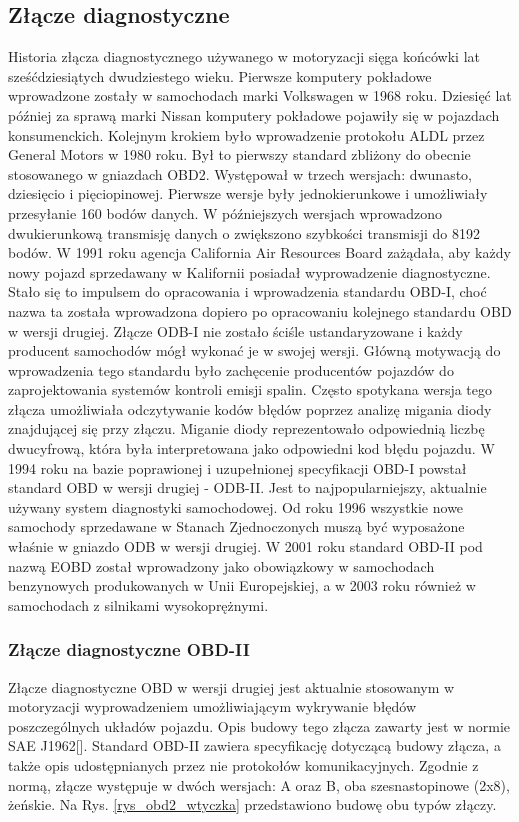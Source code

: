 \documentclass[12pt]{article} %
\numberwithin{equation}{subsection}
\numberwithin{figure}{section}
\numberwithin{table}{section}
\begin{document}
	\subsection{Złącze diagnostyczne}
		\hspace{0.5cm}Historia złącza diagnostycznego używanego w motoryzacji sięga końcówki lat sześćdziesiątych dwudziestego wieku. Pierwsze komputery pokładowe wprowadzone zostały w samochodach marki Volkswagen w 1968 roku. Dziesięć lat później za sprawą marki Nissan komputery pokładowe pojawiły się w pojazdach konsumenckich. Kolejnym krokiem było wprowadzenie protokołu ALDL  przez General Motors w 1980 roku. Był to pierwszy standard zbliżony do obecnie stosowanego w gniazdach OBD2. Występował w trzech wersjach: dwunasto, dziesięcio i pięciopinowej. Pierwsze wersje były jednokierunkowe i umożliwiały przesyłanie 160 bodów danych. W późniejszych wersjach wprowadzono dwukierunkową transmisję danych o zwiększono szybkości transmisji do 8192 bodów. W 1991 roku agencja California Air Resources Board zażądała, aby każdy nowy pojazd sprzedawany w Kalifornii posiadał wyprowadzenie diagnostyczne. Stało się to impulsem do opracowania i wprowadzenia standardu OBD-I, choć nazwa ta została wprowadzona dopiero po opracowaniu kolejnego standardu OBD w wersji drugiej. Złącze ODB-I nie zostało ściśle ustandaryzowane i każdy producent samochodów mógł wykonać je w swojej wersji. Główną motywacją do wprowadzenia tego standardu było zachęcenie producentów pojazdów do zaprojektowania systemów kontroli emisji spalin. Często spotykana wersja tego złącza umożliwiała odczytywanie kodów błędów poprzez analizę migania diody znajdującej się przy złączu. Miganie diody reprezentowało odpowiednią liczbę dwucyfrową, która była interpretowana jako odpowiedni kod błędu pojazdu. W 1994 roku na bazie poprawionej i uzupełnionej specyfikacji OBD-I powstał standard OBD w wersji drugiej - ODB-II. Jest to najpopularniejszy, aktualnie używany system diagnostyki samochodowej. Od roku 1996 wszystkie nowe samochody sprzedawane w Stanach Zjednoczonych muszą być wyposażone właśnie w gniazdo ODB w wersji drugiej. W 2001 roku standard OBD-II pod nazwą EOBD został wprowadzony jako obowiązkowy w samochodach benzynowych produkowanych w Unii Europejskiej, a w 2003 roku również w samochodach z silnikami wysokoprężnymi.
		
		\newpage
		
		\subsubsection{Złącze diagnostyczne OBD-II}
			\hspace{0.5cm}Złącze diagnostyczne OBD w wersji drugiej jest aktualnie stosowanym w motoryzacji wyprowadzeniem umożliwiającym wykrywanie błędów poszczególnych układów pojazdu. Opis budowy tego złącza zawarty jest w normie SAE J1962[\cite{saej1962}]. Standard OBD-II zawiera specyfikację dotyczącą budowy złącza, a także opis udostępnianych przez nie protokołów komunikacyjnych. Zgodnie z normą, złącze występuje w dwóch wersjach: A oraz B, oba szesnastopinowe (2x8), żeńskie. Na Rys. \ref{rys_obd2_wtyczka} przedstawiono budowę obu typów złączy.
		
\end{document}

